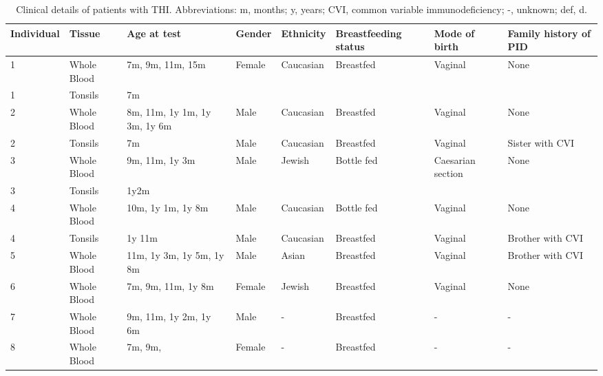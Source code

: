 \documentclass[12pt]{article}
\begin{document}
			
			\begin{landscape} %
				\footnotesize
				\begin{longtable}[c]{|l | l |l|l|l|l|l|l|}
					\caption{Clinical details of patients with THI. Abbreviations: m, months; y, years; CVI, common variable immunodeficiency; -, unknown; def, d.} \\ \hline 	
					Individual & Tissue & Age at test  & Gender  & Ethnicity   & Breastfeeding status & Mode of birth & Family history of PID    \\ \hline \hline
					\endhead
					\hline 	\endfoot 
					\label{table:samples}
					1  & Whole Blood & 7m, 9m, 11m, 15m             & Female & Caucasian & Breastfed  & Vaginal           & None                 \\
					1  & Tonsils     & 7m                           &        &           &            &                   &  \\
					2  & Whole Blood & 8m, 11m, 1y 1m, 1y 3m, 1y 6m & Male   & Caucasian & Breastfed  & Vaginal           & None                 \\
					2  & Tonsils     & 7m                           & Male   & Caucasian & Breastfed  & Vaginal           & Sister with CVI      \\
					3  & Whole Blood & 9m, 11m, 1y 3m               & Male   & Jewish    & Bottle fed & Caesarian section & None                 \\
					3  & Tonsils     & 1y2m                         &        &           &            &                   &  \\
					4  & Whole Blood & 10m, 1y 1m,  1y 8m           & Male   & Caucasian & Bottle fed & Vaginal           & None                 \\
					4  & Tonsils     & 1y 11m                       & Male   & Caucasian & Breastfed  & Vaginal           & Brother with CVI     \\
					5  & Whole Blood & 11m, 1y 3m, 1y 5m, 1y 8m     & Male   & Asian     & Breastfed  & Vaginal           & Brother with CVI     \\
					6  & Whole Blood & 7m, 9m, 11m, 1y 8m           & Female & Jewish    & Breastfed  & Vaginal           & None                 \\
					7  & Whole Blood & 9m, 11m, 1y 2m, 1y 6m        & Male   & -         & Breastfed  & -                 & -                    \\
					8  & Whole Blood & 7m, 9m,                      & Female & -         & Breastfed  & -                 & -                    \\

\end{longtable}
\end{landscape}
\end{document}
